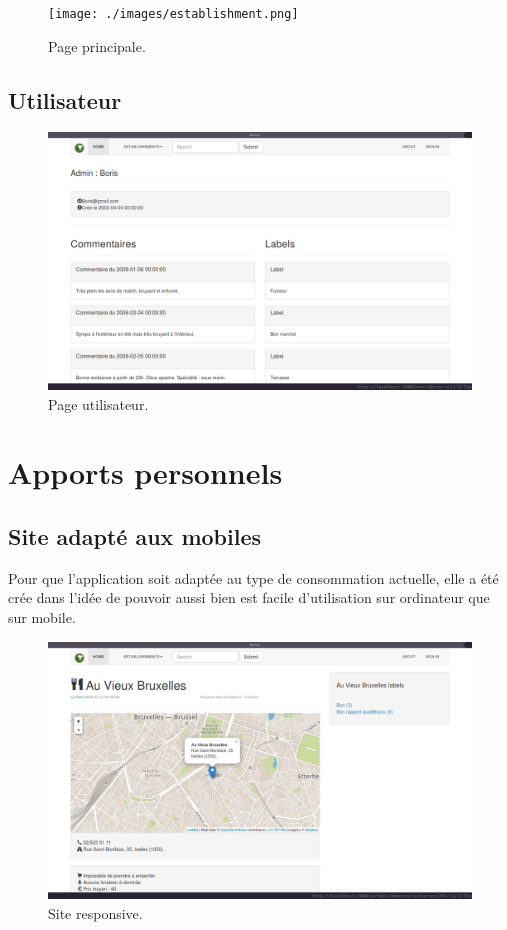\documentclass[a4paper,10pt]{article}
\begin{document}
\begin{figure}[hbt]
  \centering
  \texttt{[image: ./images/establishment.png]}
  \caption{Page principale.}
\end{figure}

\subsection{Utilisateur}
\begin{figure}[hbt]
  \centering
  \includegraphics[scale=0.2]{./images/user.png}
  \caption{Page utilisateur.}
\end{figure}

\section{Apports personnels}
\subsection{Site adapté aux mobiles}
    Pour que l'application soit adaptée au type de consommation actuelle, elle
    a été crée dans l'idée de pouvoir aussi bien est facile d'utilisation sur
    ordinateur que sur mobile.

    \begin{figure}[hbt]
        \centering
        \includegraphics[scale=0.2]{./images/responsive.png}
        \caption{Site responsive.}
    \end{figure}
\end{document}
